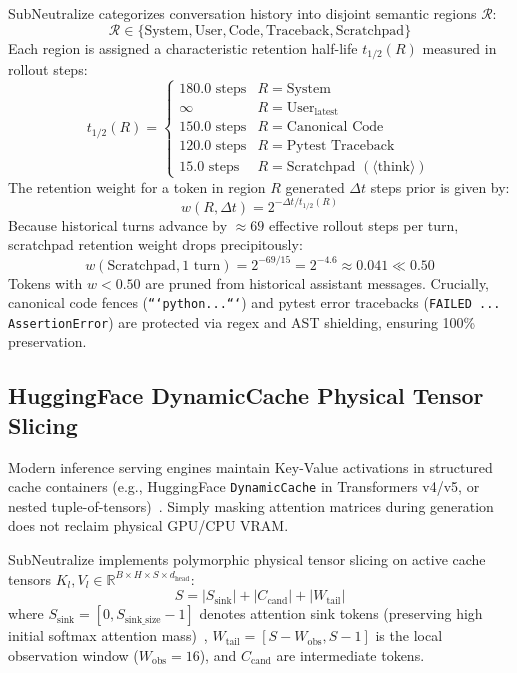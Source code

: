 \documentclass[10pt,twocolumn,letterpaper]{article}
\begin{document}
SubNeutralize categorizes conversation history into disjoint semantic regions $\mathcal{R}$:
\begin{equation}
\mathcal{R} \in \{\text{System}, \text{User}, \text{Code}, \text{Traceback}, \text{Scratchpad}\}
\end{equation}
Each region is assigned a characteristic retention half-life $t_{1/2}(R)$ measured in rollout steps:
\begin{equation}
t_{1/2}(R) = \begin{cases}
180.0 \text{ steps} & R = \text{System} \\
\infty & R = \text{User}_{\text{latest}} \\
150.0 \text{ steps} & R = \text{Canonical Code} \\
120.0 \text{ steps} & R = \text{Pytest Traceback} \\
15.0 \text{ steps} & R = \text{Scratchpad } (\langle\text{think}\rangle)
\end{cases}
\end{equation}
The retention weight for a token in region $R$ generated $\Delta t$ steps prior is given by:
\begin{equation}
w(R, \Delta t) = 2^{-\Delta t / t_{1/2}(R)}
\end{equation}
Because historical turns advance by $\approx 69$ effective rollout steps per turn, scratchpad retention weight drops precipitously:
\begin{equation}
w(\text{Scratchpad}, 1 \text{ turn}) = 2^{-69/15} = 2^{-4.6} \approx 0.041 \ll 0.50
\end{equation}
Tokens with $w < 0.50$ are pruned from historical assistant messages. Crucially, canonical code fences (\texttt{```python...```}) and pytest error tracebacks (\texttt{FAILED ... AssertionError}) are protected via regex and AST shielding, ensuring 100\% preservation.

\subsection{HuggingFace DynamicCache Physical Tensor Slicing}
Modern inference serving engines maintain Key-Value activations in structured cache containers (e.g., HuggingFace \texttt{DynamicCache} in Transformers v4/v5, or nested tuple-of-tensors)~\cite{zhang2024duoattention,yao2025cacheblend}. Simply masking attention matrices during generation does not reclaim physical GPU/CPU VRAM.

SubNeutralize implements polymorphic physical tensor slicing on active cache tensors $K_l, V_l \in \mathbb{R}^{B \times H \times S \times d_{\text{head}}}$:
\begin{equation}
S = |S_{\text{sink}}| + |C_{\text{cand}}| + |W_{\text{tail}}|
\end{equation}
where $S_{\text{sink}} = [0, S_{\text{sink\_size}}-1]$ denotes attention sink tokens (preserving high initial softmax attention mass)~\cite{xiao2024streamingllm}, $W_{\text{tail}} = [S - W_{\text{obs}}, S-1]$ is the local observation window ($W_{\text{obs}} = 16$), and $C_{\text{cand}}$ are intermediate tokens.
\end{document}
